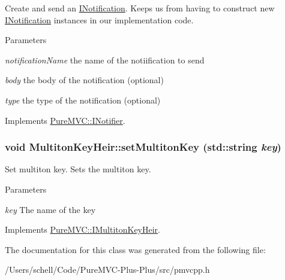 Create and send an {\ttfamily \hyperlink{class_pure_m_v_c_1_1_i_notification}{INotification}}. Keeps us from having to construct new \hyperlink{class_pure_m_v_c_1_1_i_notification}{INotification} instances in our implementation code. 
\begin{DoxyParams}{Parameters}
\item[{\em notificationName}]the name of the notiification to send \item[{\em body}]the body of the notification (optional) \item[{\em type}]the type of the notification (optional) \end{DoxyParams}


Implements \hyperlink{class_pure_m_v_c_1_1_i_notifier_a65e8333ccfea74138b79f84dac96af25}{PureMVC::INotifier}.\hypertarget{class_pure_m_v_c_1_1_multiton_key_heir_abc70ef7c066bc8d7bf0196ec727599bb}{
\subsubsection[{setMultitonKey}]{\setlength{\rightskip}{0pt plus 5cm}void MultitonKeyHeir::setMultitonKey (std::string {\em key})}}
\label{class_pure_m_v_c_1_1_multiton_key_heir_abc70ef7c066bc8d7bf0196ec727599bb}


Set multiton key. Sets the multiton key. 
\begin{DoxyParams}{Parameters}
\item[{\em key}]The name of the key \end{DoxyParams}


Implements \hyperlink{class_pure_m_v_c_1_1_i_multiton_key_heir_a03acb75ab79defba2c28b8de1bbe1ca6}{PureMVC::IMultitonKeyHeir}.

The documentation for this class was generated from the following file:\begin{DoxyCompactItemize}
\item 
/Users/schell/Code/PureMVC-\/Plus-\/Plus/src/pmvcpp.h\end{DoxyCompactItemize}
